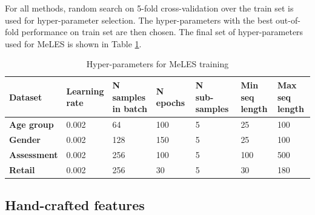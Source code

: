 \documentclass{article}
\begin{document}
For all methods, random search on 5-fold cross-validation over the train set is used for hyper-parameter selection. The hyper-parameters with the best out-of-fold performance on train set are then chosen. The final set of hyper-parameters used for MeLES is shown in Table \ref{tab-hyper}.

\begin{table}
\centering
\caption{Hyper-parameters for MeLES training}
\begin{tabular}{lllllll}
\toprule
\textbf{Dataset} & \makecell[l]{\textbf{Learning} \\ \textbf{rate}} & \makecell[l]{\textbf{N samples} \\ \textbf{in batch}} & \textbf{N epochs} & \makecell[l]{\textbf{N} \\ \textbf{sub-samples}}} & \makecell[l]{\textbf{Min seq} \\ \textbf{length}} & \makecell[l]{\textbf{Max seq} \\ \textbf{length}} \\
\midrule
\textbf{Age group} & 0.002 & 64 & 100 & 5 & 25 & 100 \\
\textbf{Gender} & 0.002 & 128 & 150 & 5 & 25 & 100 \\
\textbf{Assessment} & 0.002 & 256 & 100 & 5 & 100 & 500 \\
\textbf{Retail} & 0.002 & 256 & 30 & 5 & 30 & 180 \\
\bottomrule
\end{tabular}
\label{tab-hyper}
\end{table}

\subsection{Hand-crafted features}
\end{document}
